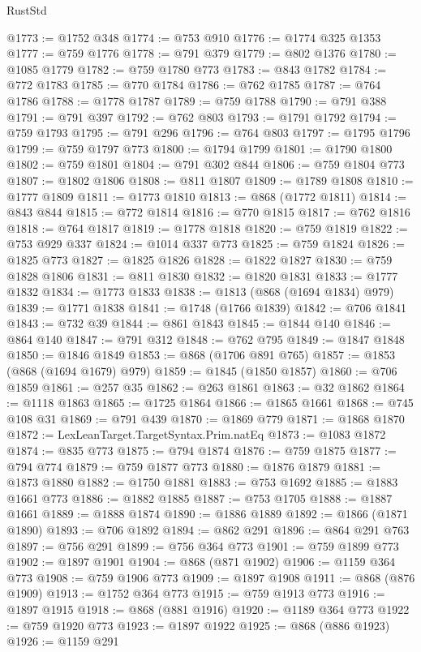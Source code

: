 \begin{lexlean}{RustStd}
\begin{coremodule}
@1773 := @1752 @348
@1774 := @753 @910
@1776 := @1774 @325 @1353
@1777 := @759 @1776
@1778 := @791 @379
@1779 := @802 @1376
@1780 := @1085 @1779
@1782 := @759 @1780 @773
@1783 := @843 @1782
@1784 := @772 @1783
@1785 := @770 @1784
@1786 := @762 @1785
@1787 := @764 @1786
@1788 := @1778 @1787
@1789 := @759 @1788
@1790 := @791 @388
@1791 := @791 @397
@1792 := @762 @803
@1793 := @1791 @1792
@1794 := @759 @1793
@1795 := @791 @296
@1796 := @764 @803
@1797 := @1795 @1796
@1799 := @759 @1797 @773
@1800 := @1794 @1799
@1801 := @1790 @1800
@1802 := @759 @1801
@1804 := @791 @302 @844
@1806 := @759 @1804 @773
@1807 := @1802 @1806
@1808 := @811 @1807
@1809 := @1789 @1808
@1810 := @1777 @1809
@1811 := @1773 @1810
@1813 := @868 (@1772 @1811)
@1814 := @843 @844
@1815 := @772 @1814
@1816 := @770 @1815
@1817 := @762 @1816
@1818 := @764 @1817
@1819 := @1778 @1818
@1820 := @759 @1819
@1822 := @753 @929 @337
@1824 := @1014 @337 @773
@1825 := @759 @1824
@1826 := @1825 @773
@1827 := @1825 @1826
@1828 := @1822 @1827
@1830 := @759 @1828 @1806
@1831 := @811 @1830
@1832 := @1820 @1831
@1833 := @1777 @1832
@1834 := @1773 @1833
@1838 := @1813 (@868 (@1694 @1834) @979)
@1839 := @1771 @1838
@1841 := @1748 (@1766 @1839)
@1842 := @706 @1841
@1843 := @732 @39
@1844 := @861 @1843
@1845 := @1844 @140
@1846 := @864 @140
@1847 := @791 @312
@1848 := @762 @795
@1849 := @1847 @1848
@1850 := @1846 @1849
@1853 := @868 (@1706 @891 @765)
@1857 := @1853 (@868 (@1694 @1679) @979)
@1859 := @1845 (@1850 @1857)
@1860 := @706 @1859
@1861 := @257 @35
@1862 := @263 @1861
@1863 := @32 @1862
@1864 := @1118 @1863
@1865 := @1725 @1864
@1866 := @1865 @1661
@1868 := @745 @108 @31
@1869 := @791 @439
@1870 := @1869 @779
@1871 := @1868 @1870
@1872 := LexLeanTarget.TargetSyntax.Prim.natEq
@1873 := @1083 @1872
@1874 := @835 @773
@1875 := @794 @1874
@1876 := @759 @1875
@1877 := @794 @774
@1879 := @759 @1877 @773
@1880 := @1876 @1879
@1881 := @1873 @1880
@1882 := @1750 @1881
@1883 := @753 @1692
@1885 := @1883 @1661 @773
@1886 := @1882 @1885
@1887 := @753 @1705
@1888 := @1887 @1661
@1889 := @1888 @1874
@1890 := @1886 @1889
@1892 := @1866 (@1871 @1890)
@1893 := @706 @1892
@1894 := @862 @291
@1896 := @864 @291 @763
@1897 := @756 @291
@1899 := @756 @364 @773
@1901 := @759 @1899 @773
@1902 := @1897 @1901
@1904 := @868 (@871 @1902)
@1906 := @1159 @364 @773
@1908 := @759 @1906 @773
@1909 := @1897 @1908
@1911 := @868 (@876 @1909)
@1913 := @1752 @364 @773
@1915 := @759 @1913 @773
@1916 := @1897 @1915
@1918 := @868 (@881 @1916)
@1920 := @1189 @364 @773
@1922 := @759 @1920 @773
@1923 := @1897 @1922
@1925 := @868 (@886 @1923)
@1926 := @1159 @291

\end{coremodule}
\end{lexlean}
